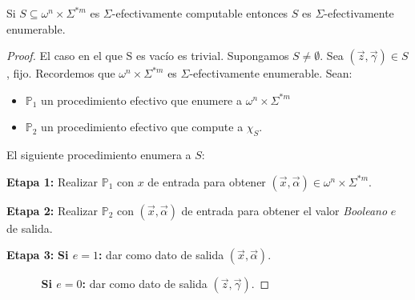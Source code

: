   \begin{lemma}
    \PN Si $S \subseteq \omega^{n} \times \Sigma^{\ast m}$ es $\Sigma$-efectivamente computable entonces $S$ es
    $\Sigma$-efectivamente enumerable.
  \end{lemma}
  \begin{proof}
    \PN El caso en el que S es vacío es trivial. Supongamos $S \neq \emptyset$. Sea $(\vec{z}, \vec{\gamma}) \in S$,
    fijo. Recordemos que $\omega^{n} \times \Sigma^{\ast m}$ es $\Sigma$-efectivamente enumerable. Sean:

    \begin{itemize}
      \item $\mathbb{P}_{1}$ un procedimiento efectivo que enumere a $\omega^{n} \times \Sigma^{\ast m}$
      \item $\mathbb{P}_{2}$ un procedimiento efectivo que compute a $\chi_{S}$.
    \end{itemize}

    \PN El siguiente procedimiento enumera a $S$:

    \vspace{3mm}
    \PN \textbf{Etapa 1:}
    Realizar $\mathbb{P}_{1}$ con $x$ de entrada para obtener $(\vec{x}, \vec{\alpha}) \in \omega^{n}\times
    \Sigma^{\ast m}$.

    \PN \textbf{Etapa 2:}
    Realizar $\mathbb{P}_{2}$ con $(\vec{x}, \vec{\alpha})$ de entrada para obtener el valor \textit{Booleano} $e$ de
    salida.

    \PN \textbf{Etapa 3:}
    \textbf{Si $e=1$:} dar como dato de salida $(\vec{x}, \vec{\alpha})$.

    $\qquad\;\;\;\;$\textbf{Si $e=0$:} dar como dato de salida $(\vec{z}, \vec{\gamma})$.
  \end{proof}

